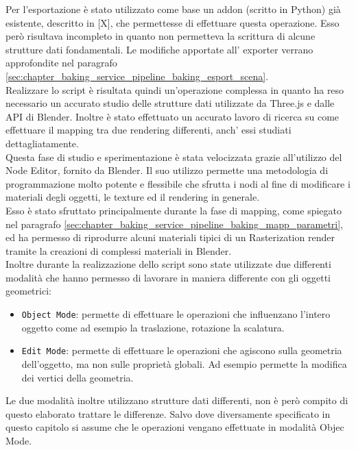 Per l’esportazione è stato utilizzato come base un addon (scritto in Python) già esistente, descritto in [X], che permettesse di effettuare questa operazione. Esso però risultava incompleto in quanto non permetteva la scrittura di alcune strutture dati fondamentali. Le modifiche apportate all’ exporter verrano approfondite nel paragrafo \ref{sec:chapter_baking_service_pipeline_baking_esport_scena}.
\\
Realizzare lo script è risultata quindi un’operazione complessa in quanto ha reso necessario un accurato studio delle strutture dati utilizzate da Three.js e dalle API di Blender.
Inoltre è stato effettuato un accurato lavoro di ricerca su come effettuare il mapping tra due rendering differenti, anch’ essi studiati dettagliatamente.
\\
Questa fase di studio e sperimentazione è stata velocizzata grazie all’utilizzo del Node Editor, fornito da Blender.
Il suo utilizzo permette una metodologia di programmazione molto potente e flessibile che sfrutta i nodi al fine di modificare i materiali degli oggetti, le texture ed il rendering in generale.
\\
Esso è stato sfruttato principalmente durante la fase di mapping, come spiegato nel paragrafo \ref{sec:chapter_baking_service_pipeline_baking_mapp_parametri}, ed ha permesso di riprodurre alcuni materiali tipici di un Rasterization render tramite la creazioni di complessi materiali in Blender.
\\
Inoltre durante la realizzazione dello script sono state utilizzate due differenti modalità che hanno permesso di lavorare in maniera differente con gli oggetti geometrici:
\begin{itemize}
\item \texttt{Object Mode}: permette di effettuare le operazioni che influenzano l’intero oggetto come ad esempio la traslazione, rotazione la scalatura.
\item \texttt{Edit Mode}: permette di effettuare le operazioni che agiscono sulla geometria dell’oggetto, ma non sulle proprietà globali. Ad esempio permette la modifica dei vertici della geometria.
\end{itemize}
Le due modalità inoltre utilizzano strutture dati differenti, non è però compito di questo elaborato trattare le differenze.
Salvo dove diversamente specificato in questo capitolo si assume che le operazioni vengano effettuate in modalità Objec Mode. 


